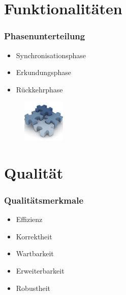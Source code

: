\documentclass{beamer}
\begin{document}
\section{Funktionalitäten}
\begin{frame}
  \frametitle{Phasenunterteilung}
  
  	\begin{itemize}
		\item Synchronisationsphase
		\item Erkundungsphase
		\item Rückkehrphase
	\end{itemize}  
	\begin{figure}[bp]
		\includegraphics[height=2cm]{funktional.jpg} 
	\end{figure}
	
\end{frame}


\section{Qualität}
\begin{frame}
  \frametitle{Qualitätsmerkmale}
  
  	\begin{itemize}
		\item Effizienz
		\item Korrektheit
		\item Wartbarkeit
		\item Erweiterbarkeit
		\item Robustheit
	\end{itemize}  
\end{frame}
\end{document}
